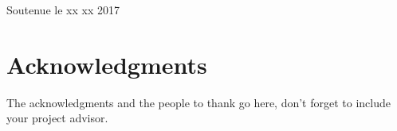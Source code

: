 \documentclass[a4paper,12pt]{article}
\begin{document}
\begin{titlepage}
\begin{center}
\vspace*{2cm}

{\large Soutenue le xx xx 2017}\\[1cm]

\vfill

\end{center}
\end{titlepage}

\tableofcontents

\newpage



\section*{Acknowledgments}
The acknowledgments and the people to thank go here, don't forget to include your project advisor.
\newpage



\listoffigures %









\pagestyle{fancy}









%





\nocite{*}
\end{document}
